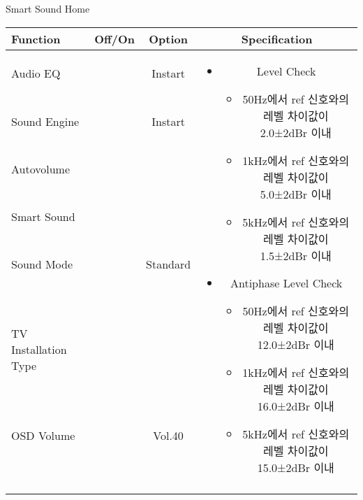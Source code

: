 \begin{frame}[t]{Smart Sound Home}
\begin{tiny}
\begin{tabular}{@{}lccc@{}}
\toprule
Function & Off/On & Option & Specification \\
\midrule
Audio EQ & \color{black}{Off} & Instart &
\multirow{10}{60mm}{
\begin{itemize}
\item Level Check
	\begin{itemize}
	\item 50Hz에서 ref 신호와의 레벨 차이값이 2.0±2dBr 이내
	\item 1kHz에서 ref 신호와의 레벨 차이값이 5.0±2dBr 이내
	\item 5kHz에서 ref 신호와의 레벨 차이값이 1.5±2dBr 이내
	\end{itemize}
\item Antiphase Level Check
	\begin{itemize}
	\item 50Hz에서 ref 신호와의 레벨 차이값이 12.0±2dBr 이내
	\item 1kHz에서 ref 신호와의 레벨 차이값이 16.0±2dBr 이내
	\item 5kHz에서 ref 신호와의 레벨 차이값이 15.0±2dBr 이내
	\end{itemize}
\end{itemize}
} \\
Sound Engine & \color{blue}{On} & Instart & \\
Autovolume & \color{black}{Off} & & \\
Smart Sound & \color{blue}{On} & & \\
Sound Mode & \color{blue}{On} & Standard & \\
TV Installation Type & \color{blue}{On} & \color{black}{Standtype1} & \\
OSD Volume & \color{blue}{On} & Vol.40 & \\
& & & \\
& & & \\
& & & \\
& & & \\
\midrule
\end{tabular}
\end{tiny}

\end{frame}